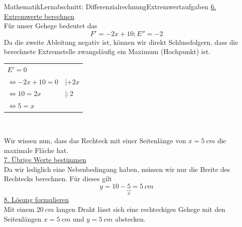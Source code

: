 \documentclass[11pt,twocolumn,oneside,openany,headings=optiontotoc,11pt,numbers=noenddot]{article}
\begin{document}
\begin{worksheet}{Mathematik}{Lernabschnitt: Differenzialrechnung}{Extremwertaufgaben}
		\underline{6. Extremwerte berechnen}\\
		Für unser Gehege bedeutet das
		\[F' = -2x + 10; E'' = -2\]
		Da die zweite Ableitung negativ ist, können wir direkt Schlussfolgern, dass die berechnete Extremstelle zwangsläufig ein Maximum (Hochpunkt) ist.\\
		\begin{tabularx}{0.48\textwidth}{Xl}
			\(E' = 0\)\\
			\(\Leftrightarrow -2x + 10 = 0\) & |\(+2x\)\\
			\(\Leftrightarrow 10 = 2x\) & |\(:2\)\\
			\(\Leftrightarrow 5 = x\)
		\end{tabularx}\\
		\par\noindent
		Wir wissen nun, dass das Rechteck mit einer Seitenlänge von \(x=5\ cm\) die maximale Fläche hat.\\
		\underline{7. Übrige Werte bestimmen}\\
		Da wir lediglich eine Nebenbedingung haben, müssen wir nur die Breite des Rechtecks berechnen. Für dieses gilt \[y = 10 - \underbrace{5}_{x} = 5\ cm\]
		\underline{8. Lösung formulieren}\\
		Mit einem \(20\ cm\) langen Draht lässt sich eine rechteckiges Gehege mit den Seitenlängen \(x = 5\ cm\) und \(y = 5\ cm\) abstecken.
	\end{worksheet}
\end{document}
